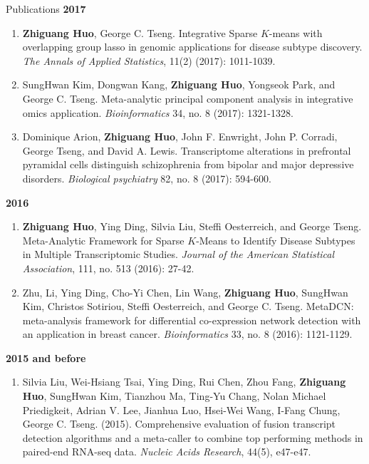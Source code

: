 \documentclass{resume} %
\begin{document}
\begin{rSection}{Publications}
\textbf{2017}
\begin{enumerate}[noitemsep,topsep=0pt, resume]

\item {\bf Zhiguang Huo}, George C. Tseng. 
    Integrative Sparse $K$-means with overlapping group lasso in genomic applications for disease subtype discovery.
    \emph{The Annals of Applied Statistics}, 11(2) (2017): 1011-1039.

\item 
SungHwan Kim, Dongwan Kang, {\bf Zhiguang Huo}, Yongseok Park, and George C. Tseng. 
Meta-analytic principal component analysis in integrative omics application. 
\emph{Bioinformatics} 34, no. 8 (2017): 1321-1328.


\item  
Dominique Arion, {\bf Zhiguang Huo}, John F. Enwright, John P. Corradi, George Tseng, and David A. Lewis. Transcriptome alterations in prefrontal pyramidal cells distinguish schizophrenia from bipolar and major depressive disorders. \emph{Biological psychiatry} 82, no. 8 (2017): 594-600.





\end{enumerate}

\textbf{2016}
\begin{enumerate}[noitemsep,topsep=0pt,resume]

 \item  {\bf Zhiguang Huo}, Ying Ding, Silvia Liu, Steffi Oesterreich, and George Tseng. Meta-Analytic Framework for Sparse $K$-Means to Identify Disease Subtypes in Multiple Transcriptomic Studies. \emph{Journal of the American Statistical Association},  111, no. 513 (2016): 27-42.

\item 
Zhu, Li, Ying Ding, Cho-Yi Chen, Lin Wang,  {\bf Zhiguang Huo}, SungHwan Kim, Christos Sotiriou, Steffi Oesterreich, and George C. Tseng. MetaDCN: meta-analysis framework for differential co-expression network detection with an application in breast cancer. \emph{Bioinformatics} 33, no. 8 (2016): 1121-1129.




\end{enumerate}


\textbf{2015 and before}
\begin{enumerate}[noitemsep,topsep=0pt,resume]
    \item Silvia Liu, Wei-Hsiang Tsai, Ying Ding, Rui Chen, Zhou Fang, {\bf Zhiguang Huo}, SungHwan Kim, Tianzhou Ma, Ting-Yu Chang, Nolan Michael Priedigkeit, Adrian V. Lee, Jianhua Luo, Hsei-Wei Wang, I-Fang Chung, George C. Tseng. (2015).
Comprehensive evaluation of fusion transcript detection algorithms and a meta-caller to combine top performing methods in paired-end RNA-seq data.
\emph{Nucleic Acids Research}, 44(5), e47-e47. 


\end{enumerate}
\end{rSection}
\end{document}
